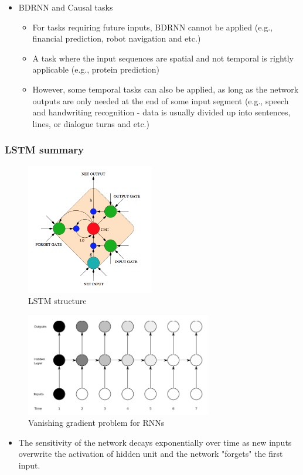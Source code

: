 \documentclass{beamer}
\begin{document}
\frame
{
    \begin{itemize}
        \item BDRNN and Causal tasks 
            \begin{itemize} 
                \item For tasks requiring future inputs, BDRNN cannot be applied (e.g., financial prediction, robot navigation and etc.)  
                \item A task where the input sequences are spatial and not temporal is rightly applicable (e.g., protein prediction)
                \item However, some temporal tasks can also be applied, as long as the network outputs are only needed at the end of some input segment (e.g., speech and handwriting recognition - data is usually divided up into sentences, lines, or dialogue turns and etc.)
            \end{itemize}
    \end{itemize}
}
\frame
{
    \frametitle{LSTM summary}
	\begin{figure}[ht]  
		\begin{center}
			\includegraphics[width=2.2in]{Images/LSTM.png}   
		\end{center}   
		\caption{LSTM structure}
	\end{figure}
}
\frame
{
	\begin{figure}[ht]  
		\begin{center}
			\includegraphics[width=3.2in]{Images/rnn_vanishing_gradients.png}   
		\end{center}   
		\caption{Vanishing gradient problem for RNNs}
	\end{figure}
	\vspace{-0.5cm}
	\begin{itemize}
		\item The sensitivity of the network decays exponentially over time as new inputs overwrite the activation of hidden unit and the network "forgets" the first input. 
	\end{itemize}
}
\end{document}
